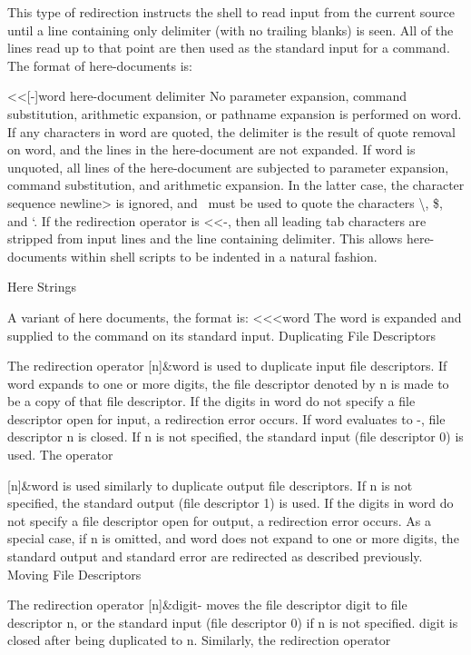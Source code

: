 \documentclass[11pt]{article}
\begin{document}
{{{This type of redirection instructs the shell to read input from the current source until a line containing only delimiter (with no trailing blanks) is seen. All of the lines read up to that point are then used as the standard input for a command.
The format of here-documents is:

<<[-]word
        here-document
delimiter
No parameter expansion, command substitution, arithmetic expansion, or pathname expansion is performed on word. If any characters in word are quoted, the delimiter is the result of quote removal on word, and the lines in the here-document are not expanded. If word is unquoted, all lines of the here-document are subjected to parameter expansion, command substitution, and arithmetic expansion. In the latter case, the character sequence \<newline> is ignored, and \ must be used to quote the characters \textbackslash, \$, and `.
If the redirection operator is <<-, then all leading tab characters are stripped from input lines and the line containing delimiter. This allows here-documents within shell scripts to be indented in a natural fashion.

Here Strings

A variant of here documents, the format is:
<<<word
The word is expanded and supplied to the command on its standard input.
Duplicating File Descriptors

The redirection operator
[n]\&word
is used to duplicate input file descriptors. If word expands to one or more digits, the file descriptor denoted by n is made to be a copy of that file descriptor. If the digits in word do not specify a file descriptor open for input, a redirection error occurs. If word evaluates to -, file descriptor n is closed. If n is not specified, the standard input (file descriptor 0) is used.
The operator

[n]\&word
is used similarly to duplicate output file descriptors. If n is not specified, the standard output (file descriptor 1) is used. If the digits in word do not specify a file descriptor open for output, a redirection error occurs. As a special case, if n is omitted, and word does not expand to one or more digits, the standard output and standard error are redirected as described previously.
Moving File Descriptors

The redirection operator
[n]\&digit-
moves the file descriptor digit to file descriptor n, or the standard input (file descriptor 0) if n is not specified. digit is closed after being duplicated to n.
Similarly, the redirection operator

}}}
\end{document}
